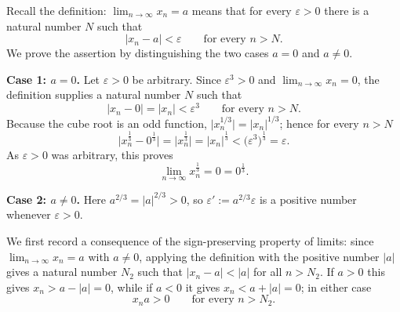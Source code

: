 \documentclass[11pt,a4paper]{article}
\newenvironment{solution}[1]{%
  \par\addvspace{1.7ex}%
  \noindent{\color{solutioncolor}\textbf{#1}}\hspace{0.55em}\ignorespaces}%
  {\par\addvspace{0.9ex}}
\begin{document}
\begin{solution}{Solution 2.1.12}\label{es:2.1.12}
Recall the definition: $\displaystyle\lim_{n\to\infty}x_{n}=a$ means that for every $\varepsilon>0$ there is a natural number $N$ such that
\[
\lvert x_{n}-a\rvert<\varepsilon\qquad\text{for every }n>N .
\]
We prove the assertion by distinguishing the two cases $a=0$ and $a\neq 0$.

\medskip
\noindent\textbf{Case 1: $a=0$.}
Let $\varepsilon>0$ be arbitrary. Since $\varepsilon^{3}>0$ and $\displaystyle\lim_{n\to\infty}x_{n}=0$, the definition supplies a natural number $N$ such that
\[
\lvert x_{n}-0\rvert=\lvert x_{n}\rvert<\varepsilon^{3}\qquad\text{for every }n>N .
\]
Because the cube root is an odd function, $\lvert x_{n}^{1/3}\rvert=\lvert x_{n}\rvert^{1/3}$; hence for every $n>N$
\[
\bigl\lvert x_{n}^{\frac{1}{3}}-0^{\frac{1}{3}}\bigr\rvert=\lvert x_{n}^{\frac{1}{3}}\rvert=\lvert x_{n}\rvert^{\frac{1}{3}}<\bigl(\varepsilon^{3}\bigr)^{\frac{1}{3}}=\varepsilon .
\]
As $\varepsilon>0$ was arbitrary, this proves
\[
\lim_{n\to\infty}x_{n}^{\frac{1}{3}}=0=0^{\frac{1}{3}} .
\]

\medskip
\noindent\textbf{Case 2: $a\neq 0$.}
Here $a^{2/3}=\lvert a\rvert^{2/3}>0$, so $\varepsilon' :=a^{2/3}\varepsilon$ is a positive number whenever $\varepsilon>0$.

We first record a consequence of the sign-preserving property of limits: since $\displaystyle\lim_{n\to\infty}x_{n}=a$ with $a\neq 0$, applying the definition with the positive number $\lvert a\rvert$ gives a natural number $N_{2}$ such that $\lvert x_{n}-a\rvert<\lvert a\rvert$ for all $n>N_{2}$. If $a>0$ this gives $x_{n}>a-\lvert a\rvert=0$, while if $a<0$ it gives $x_{n}<a+\lvert a\rvert=0$; in either case
\[
x_{n}a>0\qquad\text{for every }n>N_{2}.
\]


\end{solution}
\end{document}
